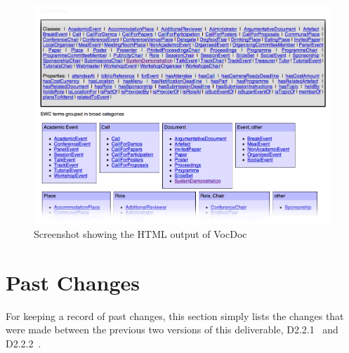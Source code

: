\documentclass{article}
\begin{document}
\begin{figure}
  \begin{center}
    \includegraphics[width=\linewidth]{images/vocdoc_overview}
    \caption{Screenshot showing the HTML output of VocDoc}
    \label{fig:vocdoc_overview}
  \end{center}
\end{figure}



\clearpage
{}
\section{Past Changes} %
\label{sec:old_changes}

For keeping a record of past changes, this section simply lists the changes that were made between the previous two versions of this deliverable, D2.2.1~\cite{moeller2009fast_ontology} and D2.2.2~\cite{moeller2010fast_ontology}.
\end{document}
